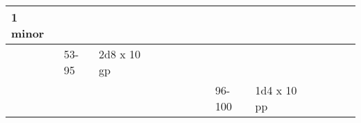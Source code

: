 \begin{longtable}{llllllllllllll}
{\begin{minipage}[t]{0.058in}
1 minor\end{minipage}}\\
\hline
\multicolumn{1}{p{0.058in}|}{\begin{minipage}[t]{0.058in}\centering
\end{minipage}} & \multicolumn{1}{|p{0.393in}|}{\begin{minipage}[t]{0.393in}\raggedright
53-95\end{minipage}} & \multicolumn{1}{p{0.469in}|}{\begin{minipage}[t]{0.469in}\raggedright
2d8 x 10 gp\end{minipage}} & \multicolumn{1}{p{0.923in}|}{\begin{minipage}[t]{0.923in}\raggedright
\end{minipage}} & \multicolumn{1}{p{0.469in}|}{\begin{minipage}[t]{0.469in}\raggedright
\end{minipage}} & \multicolumn{1}{p{0.626in}|}{\begin{minipage}[t]{0.626in}\raggedright
\end{minipage}} & \multicolumn{1}{p{0.469in}|}{\begin{minipage}[t]{0.469in}\centering
\end{minipage}}\\
\hline
\multicolumn{8}{p{1.150in}|}{\begin{minipage}[t]{1.150in}\centering
\end{minipage}} & \multicolumn{1}{|p{0.393in}|}{\begin{minipage}[t]{0.393in}\raggedright
96-100\end{minipage}} & \multicolumn{1}{p{0.469in}|}{\begin{minipage}[t]{0.469in}\raggedright
1d4 x 10 pp\end{minipage}} & \multicolumn{1}{p{0.923in}|}{\begin{minipage}[t]{0.923in}\raggedright
\end{minipage}} & \multicolumn{1}{p{0.469in}|}{\begin{minipage}[t]{0.469in}\raggedright
\end{minipage}} & \multicolumn{1}{p{0.626in}|}{\begin{minipage}[t]{0.626in}\raggedright
\end{minipage}} & \multicolumn{1}{p{0.469in}|}{\begin{minipage}[t]{0.469in}\centering
\end{minipage}}\\
\hline

\end{longtable}
